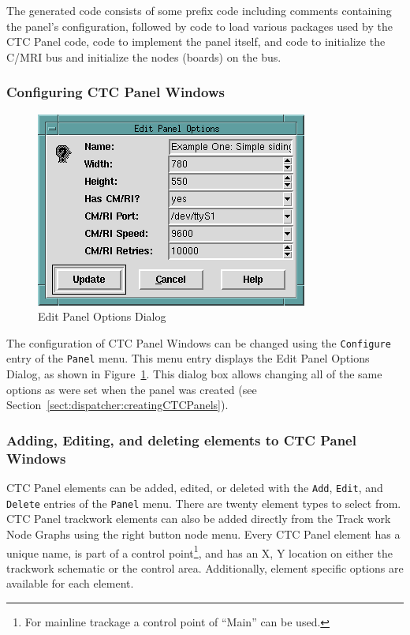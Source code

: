 The generated code consists of some prefix code including comments
containing the panel's configuration, followed by code to load various
packages used by the CTC Panel code, code to implement the panel
itself, and code to initialize the C/MRI bus and initialize the nodes
(boards) on the bus.

\subsubsection{Configuring CTC Panel Windows}

\begin{figure}[hbpt]
\begin{centering}
\includegraphics{DISPEditPanelOptions.png}
\caption{Edit Panel Options Dialog}
\label{fig:dispatcher:editPanelOptsDialog}
\end{centering}
\end{figure}
The configuration of CTC Panel Windows can be changed using the
\verb=Configure= entry of the \verb=Panel= menu.  This menu entry
displays the Edit Panel Options Dialog, as shown in
Figure~\ref{fig:dispatcher:editPanelOptsDialog}. This dialog box allows
changing all of the same options as were set when the panel was created
(see Section~\ref{sect:dispatcher:creatingCTCPanels}).

\subsubsection{Adding, Editing, and deleting elements to CTC Panel Windows}

CTC Panel elements can be added, edited, or deleted with the
\verb=Add=, \verb=Edit=, and \verb=Delete= entries of the \verb=Panel=
menu. There are twenty element types to select from.  CTC Panel
trackwork elements can also be added directly from the Track work Node
Graphs using the right button node menu.  Every CTC Panel element has a
unique name, is part of a control point\footnote{For mainline trackage a
control point of ``Main'' can be used.}, and has an X, Y location on
either the trackwork schematic or the control area. Additionally,
element specific options are available for each element.

